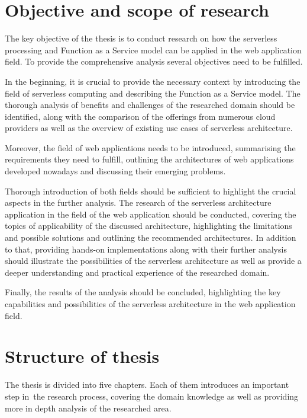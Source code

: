 \section{Objective and scope of research}

The key objective of the thesis is to conduct research on how the serverless processing and Function as a Service model can be applied in the web application field.
To provide the comprehensive analysis several objectives need to be fulfilled.

In the beginning, it is crucial to provide the necessary context by introducing the field of serverless computing and describing the Function as a Service model.
The thorough analysis of benefits and challenges of the researched domain should be identified, along with the comparison of the offerings from numerous cloud providers as well as the overview of existing use cases of serverless architecture.

Moreover, the field of web applications needs to be introduced, summarising the requirements they need to fulfill, outlining the architectures of web applications developed nowadays and discussing their emerging problems.

Thorough introduction of both fields should be sufficient to highlight the crucial aspects in the further analysis.
The research of the serverless architecture application in the field of the web application should be conducted, covering the topics of applicability of the discussed architecture,
highlighting the limitations and possible solutions and outlining the recommended architectures.
In addition to that, providing hands-on implementations along with their further analysis should illustrate the possibilities of the serverless architecture as well as provide a deeper understanding and practical experience of the researched domain.

Finally, the results of the analysis should be concluded, highlighting the key capabilities and possibilities of the serverless architecture in the web application field.

\section{Structure of thesis}

The thesis is divided into five chapters. Each of them introduces an important step in~the research process, covering the domain knowledge as well as providing more in depth analysis of the researched area.


